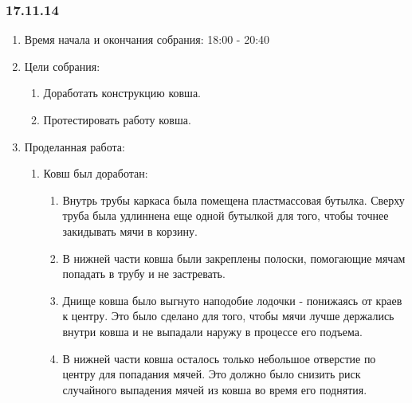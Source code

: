 
\subsubsection{17.11.14}

\begin{enumerate} 
	\item Время начала и окончания собрания:
	18:00 - 20:40
	\item Цели собрания:
	\begin{enumerate}
		\item Доработать конструкцию ковша.
		
		\item Протестировать работу ковша.
		
	\end{enumerate}
	
	\item Проделанная работа:
	\begin{enumerate}
		\item Ковш был доработан:
		\begin{enumerate}
			\item Внутрь трубы каркаса была помещена пластмассовая бутылка. Сверху труба была удлиннена еще одной бутылкой для того, чтобы точнее закидывать мячи в корзину.
			
			\item В нижней части ковша были закреплены полоски, помогающие мячам попадать в трубу и не застревать.
			
			\item Днище ковша было выгнуто наподобие лодочки - понижаясь от краев к центру. Это было сделано для того, чтобы мячи лучше держались внутри ковша и не выпадали наружу в процессе его подъема.
			
			\item В нижней части ковша осталось только небольшое отверстие по центру для попадания мячей. Это должно было снизить риск случайного выпадения мячей из ковша во время его поднятия.
			
		\end{enumerate}
		

\end{enumerate}
\end{enumerate}

